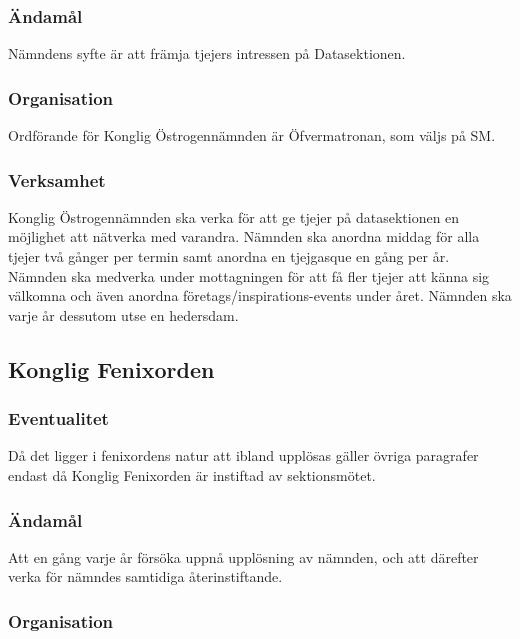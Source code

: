\documentclass{dgovdoc}
\begin{document}
\subsubsection{Ändamål}

Nämndens syfte är att främja tjejers intressen på Datasektionen.

\subsubsection{Organisation}

Ordförande för Konglig Östrogennämnden är Öfvermatronan, som väljs på SM.

\subsubsection{Verksamhet}

Konglig Östrogennämnden ska verka för att ge tjejer på datasektionen en möjlighet att
nätverka med varandra. Nämnden ska anordna middag för alla tjejer två gånger per
termin samt anordna en tjejgasque en gång per år. Nämnden ska medverka under
mottagningen för att få fler tjejer att känna sig välkomna och även anordna
företags/inspirations-events under året. Nämnden ska varje år dessutom utse en
hedersdam.

\subsection{Konglig Fenixorden}

\subsubsection{Eventualitet}

Då det ligger i fenixordens natur att ibland upplösas gäller övriga paragrafer endast då Konglig Fenixorden är instiftad av sektionsmötet.

\subsubsection{Ändamål}

Att en gång varje år försöka uppnå upplösning av nämnden, och att därefter verka för nämndes samtidiga återinstiftande.

\subsubsection{Organisation}
\end{document}
